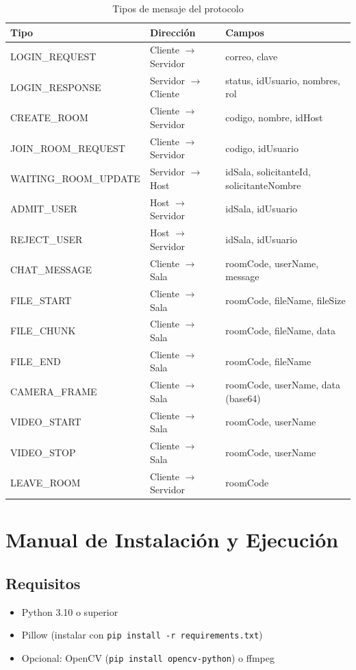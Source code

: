 \documentclass[12pt,a4paper]{article}
\begin{document}
\begin{table}[htbp]
    \centering
    \small
    \begin{tabular}{>{\raggedright\arraybackslash}p{4.5cm}p{2.5cm}p{8.5cm}}
    \toprule
    \textbf{Tipo} & \textbf{Direcci\'on} & \textbf{Campos} \\
    \midrule
    LOGIN\_REQUEST   & Cliente $\rightarrow$ Servidor & correo, clave \\
    LOGIN\_RESPONSE  & Servidor $\rightarrow$ Cliente & status, idUsuario, nombres, rol \\
    CREATE\_ROOM     & Cliente $\rightarrow$ Servidor & codigo, nombre, idHost \\
    JOIN\_ROOM\_REQUEST & Cliente $\rightarrow$ Servidor & codigo, idUsuario \\
    WAITING\_ROOM\_UPDATE & Servidor $\rightarrow$ Host & idSala, solicitanteId, solicitanteNombre \\
    ADMIT\_USER      & Host $\rightarrow$ Servidor & idSala, idUsuario \\
    REJECT\_USER     & Host $\rightarrow$ Servidor & idSala, idUsuario \\
    CHAT\_MESSAGE    & Cliente $\rightarrow$ Sala & roomCode, userName, message \\
    FILE\_START      & Cliente $\rightarrow$ Sala & roomCode, fileName, fileSize \\
    FILE\_CHUNK      & Cliente $\rightarrow$ Sala & roomCode, fileName, data \\
    FILE\_END        & Cliente $\rightarrow$ Sala & roomCode, fileName \\
    CAMERA\_FRAME    & Cliente $\rightarrow$ Sala & roomCode, userName, data (base64) \\
    VIDEO\_START     & Cliente $\rightarrow$ Sala & roomCode, userName \\
    VIDEO\_STOP      & Cliente $\rightarrow$ Sala & roomCode, userName \\
    LEAVE\_ROOM      & Cliente $\rightarrow$ Servidor & roomCode \\
    \bottomrule
    \end{tabular}
    \caption{Tipos de mensaje del protocolo}
\end{table}

\section{Manual de Instalaci\'on y Ejecuci\'on}

\subsection{Requisitos}
\begin{itemize}
    \item Python 3.10 o superior
    \item Pillow (instalar con \texttt{pip install -r requirements.txt})
    \item Opcional: OpenCV (\texttt{pip install opencv-python}) o ffmpeg
\end{itemize}
\end{document}
